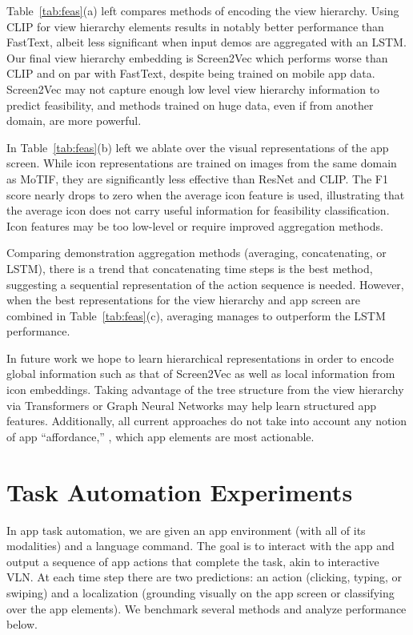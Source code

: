 Table~\ref{tab:feas}(a) left compares methods of encoding the view hierarchy. Using CLIP for view hierarchy elements results in notably better performance than FastText, albeit less significant when input demos are aggregated with an LSTM. Our final view hierarchy embedding is Screen2Vec which performs worse than CLIP and on par with FastText, despite being trained on mobile app data. Screen2Vec may not capture enough low level view hierarchy information to predict feasibility, and methods trained on huge data, even if from another domain, are more powerful.

In Table~\ref{tab:feas}(b) left we ablate over the visual representations of the app screen.
While icon representations are trained on images from the same domain as MoTIF, they are significantly less effective than ResNet and CLIP. The F1 score nearly drops to zero when the average icon feature is used, illustrating that the average icon does not carry useful information for feasibility classification. Icon features may be too low-level or require improved aggregation methods.

Comparing demonstration aggregation methods (averaging, concatenating, or LSTM), there is a trend that concatenating time steps is the best method, suggesting a sequential representation of the action sequence is needed.
However, when the best representations for the view hierarchy and app screen are combined in Table~\ref{tab:feas}(c), averaging manages to outperform the LSTM performance. 

In future work we hope to learn hierarchical representations in order to encode global information such as that of Screen2Vec as well as local information from icon embeddings. Taking advantage of the tree structure from the view hierarchy via Transformers or Graph Neural Networks may help learn structured app features. Additionally, all current approaches do not take into account any notion of app ``affordance,'' \ie, which app elements are most actionable.
\section{Task Automation Experiments}
In app task automation, we are given an app environment (with all of its modalities) and a language command. The goal is to interact with the app and output a sequence of app actions that complete the task, akin to interactive VLN. At each time step there are two predictions: an action (clicking, typing, or swiping) and a localization (grounding visually on the app screen or classifying over the app elements). We benchmark several methods and analyze performance below. %
